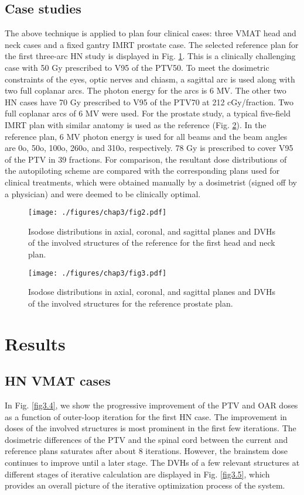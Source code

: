 \subsection{Case studies}
The above technique is applied to plan four clinical cases:  three VMAT head and neck cases and a fixed gantry IMRT prostate case. The selected reference plan for the first three-arc HN study is displayed in Fig. \ref{fig3.2}. This is a clinically challenging case with 50 Gy prescribed to V95 of the PTV50.  To meet the dosimetric constraints of the eyes, optic nerves and chiasm, a sagittal arc is used along with two full coplanar arcs. The photon energy for the arcs is 6 MV. The other two HN cases have 70 Gy prescribed to V95 of the PTV70 at 212 cGy/fraction. Two full coplanar arcs of 6 MV were used. For the prostate study, a typical five-field IMRT plan with similar anatomy is used as the reference (Fig. \ref{fig3.3}). In the reference plan, 6 MV photon energy is used for all beams and the beam angles are 0o, 50o, 100o, 260o, and 310o, respectively. 78 Gy is prescribed to cover V95 of the PTV in 39 fractions. For comparison, the resultant dose distributions of the autopiloting scheme are compared with the corresponding plans used for clinical treatments, which were obtained manually by a dosimetrist (signed off by a physician) and were deemed to be clinically optimal. 

  \begin{figure}
	\centering
	\texttt{[image: ./figures/chap3/fig2.pdf]}
	\caption{Isodose distributions in axial, coronal, and sagittal planes and DVHs of the involved structures of the reference for the first head and neck plan. 
	\label{fig3.2}}
    \end{figure}
    

  \begin{figure}
	\centering
	\texttt{[image: ./figures/chap3/fig3.pdf]}
	\caption{Isodose distributions in axial, coronal, and sagittal planes and DVHs of the involved structures for the reference prostate plan. 
	\label{fig3.3}}
    \end{figure}
    
\section{Results}

\subsection{HN VMAT cases}
In Fig. \ref{fig3.4}, we show the progressive improvement of the PTV and OAR doses as a function of outer-loop iteration for the first HN case. The improvement in doses of the involved structures is most prominent in the first few iterations. The dosimetric differences of the PTV and the spinal cord between the current and reference plans saturates after about 8 iterations. However, the brainstem dose continues to improve until a later stage. The DVHs of a few relevant structures at different stages of iterative calculation are displayed in Fig. \ref{fig3.5}, which provides an overall picture of the iterative optimization process of the system. 

